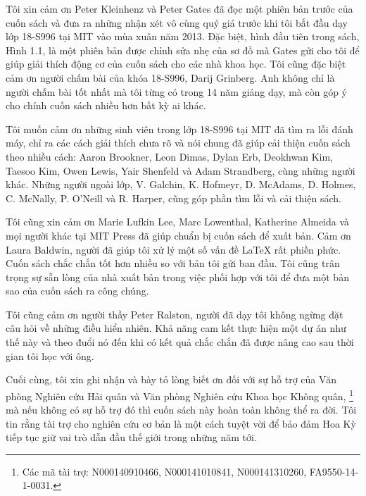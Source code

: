 Tôi xin cảm ơn Peter Kleinhenz và Peter Gates đã đọc một phiên bản trước của
cuốn sách và đưa ra những nhận xét vô cùng quý giá trước khi tôi bắt đầu dạy
lớp 18-S996 tại MIT vào mùa xuân năm 2013. Đặc biệt, hình đầu tiên trong sách,
Hình 1.1, là một phiên bản được chỉnh sửa nhẹ của sơ đồ mà Gates gửi cho tôi
để giúp giải thích động cơ của cuốn sách cho các nhà khoa học. Tôi cũng đặc
biệt cảm ơn người chấm bài của khóa 18-S996, Darij Grinberg. Anh không chỉ là
người chấm bài tốt nhất mà tôi từng có trong 14 năm giảng dạy, mà còn góp ý
cho chính cuốn sách nhiều hơn bất kỳ ai khác.

Tôi muốn cảm ơn những sinh viên trong lớp 18-S996 tại MIT đã tìm ra lỗi đánh
máy, chỉ ra các cách giải thích chưa rõ và nói chung đã giúp cải thiện cuốn
sách theo nhiều cách: Aaron Brookner, Leon Dimas, Dylan Erb, Deokhwan Kim,
Taesoo Kim, Owen Lewis, Yair Shenfeld và Adam Strandberg, cùng những người
khác. Những người ngoài lớp, V. Galchin, K. Hofmeyr, D. McAdams, D. Holmes,
C. McNally, P. O'Neill và R. Harper, cũng góp phần tìm lỗi và cải thiện sách.

Tôi cũng xin cảm ơn Marie Lufkin Lee, Marc Lowenthal, Katherine Almeida và
mọi người khác tại MIT Press đã giúp chuẩn bị cuốn sách để xuất bản. Cảm ơn
Laura Baldwin, người đã giúp tôi xử lý một số vấn đề LaTeX rất phiền phức.
Cuốn sách chắc chắn tốt hơn nhiều so với bản tôi gửi ban đầu. Tôi cũng trân
trọng sự sẵn lòng của nhà xuất bản trong việc phối hợp với tôi để đưa một
bản sao của cuốn sách ra công chúng.

Tôi cũng cảm ơn người thầy Peter Ralston, người đã dạy tôi không ngừng đặt câu
hỏi về những điều hiển nhiên. Khả năng cam kết thực hiện một dự án như thế này
và theo đuổi nó đến khi có kết quả chắc chắn đã được nâng cao sau thời gian
tôi học với ông.

Cuối cùng, tôi xin ghi nhận và bày tỏ lòng biết ơn đối với sự hỗ trợ của Văn
phòng Nghiên cứu Hải quân và Văn phòng Nghiên cứu Khoa học Không quân,
\footnote{Các mã tài trợ: N000140910466, N000141010841, N000141310260,
FA9550-14-1-0031.}
mà nếu không có sự hỗ trợ đó thì cuốn sách này hoàn toàn không thể ra đời.
Tôi tin rằng tài trợ cho nghiên cứu cơ bản là một cách tuyệt vời để bảo đảm
Hoa Kỳ tiếp tục giữ vai trò dẫn đầu thế giới trong những năm tới.
